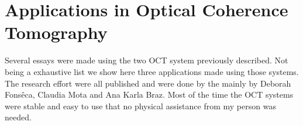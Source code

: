 \documentclass[12pt,twoside,english]{book}
\renewcommand{\~}{\perispomeni}%
\numberwithin{equation}{section}
\numberwithin{figure}{section}
\begin{document}
\chapter{Applications in Optical Coherence Tomography}

Several essays were made using the two OCT system previously described. Not being a exhaustive list we show here three applications made using those systems. The research effort were all published and were done by the mainly by Deborah Fonsêca\cite{Fonseca:2009p1}, Claudia Mota and Ana Karla Braz\cite{Braz:2009p2143}. Most of the time the OCT systems were stable and easy to use that no physical assistance from my person was needed.



%
\end{document}
